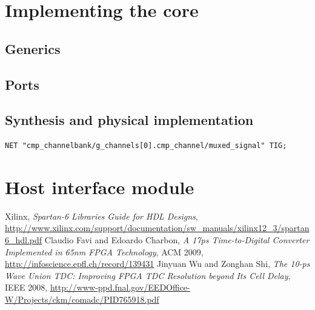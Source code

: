\documentclass[a4paper,11pt]{article}
\begin{document}
\section{Implementing the core}
\subsection{Generics}

\subsection{Ports}

\subsection{Synthesis and physical implementation}
\begin{verbatim}
NET "cmp_channelbank/g_channels[0].cmp_channel/muxed_signal" TIG;
\end{verbatim}

\section{Host interface module}

\begin{thebibliography}{99}
 Xilinx, \textsl{Spartan-6 Libraries Guide for HDL Designs}, \url{http://www.xilinx.com/support/documentation/sw_manuals/xilinx12_3/spartan6_hdl.pdf}
 Claudio Favi and Edoardo Charbon, \textsl{A 17ps Time-to-Digital Converter Implemented in 65nm FPGA Technology}, ACM 2009, \url{http://infoscience.epfl.ch/record/139431}
 Jinyuan Wu and Zonghan Shi, \textsl{The 10-ps Wave Union TDC: Improving FPGA TDC Resolution beyond Its Cell Delay}, IEEE 2008, \url{http://www-ppd.fnal.gov/EEDOffice-W/Projects/ckm/comadc/PID765918.pdf}
\end{thebibliography}
\end{document}
